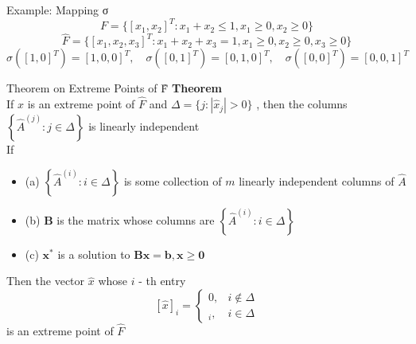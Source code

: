 \documentclass[aspectratio=169,hyperref,UTF8,CJK]{beamer}
\begin{document}
\begin{frame}{Example: Mapping σ}
\[
F = \{[x_1, x_2]^T : x_1 + x_2 \le 1, x_1 \ge 0, x_2 \ge 0\}
\]
\[
\hat{F} = \{[x_1, x_2, x_3]^T : x_1 + x_2 + x_3 = 1, x_1 \ge 0, x_2 \ge 0, x_3 \ge 0\}
\]
\[
\sigma([1, 0]^T) = [1, 0, 0]^T, \quad \sigma([0, 1]^T) = [0, 1, 0]^T, \quad \sigma([0, 0]^T) = [0, 0, 1]^T
\]
\end{frame}

\begin{frame}{Theorem on Extreme Points of F̂}
\textbf{Theorem} \\
If \(\hat{x}\) is an extreme point of \(\hat{F}\) and \(\Delta = \{j: |\hat{x}_j| > 0\}\) , then the columns \(\left\{\hat{A}^{(j)}: j \in \Delta\right\}\) is linearly independent \\
If
\begin{itemize}
    \item (a) \(\left\{\hat{A}^{(i)}: i \in \Delta\right\}\) is some collection of \(m\) linearly independent columns of \(\hat{A}\)
    \item (b) \(\mathbf{B}\) is the matrix whose columns are \(\left\{\hat{A}^{(i)}: i \in \Delta\right\}\)
    \item (c) \(\mathbf{x}^*\) is a solution to \(\mathbf{B}\mathbf{x} = \mathbf{b}, \mathbf{x} \geq \mathbf{0}\)
\end{itemize}
Then the vector \(\hat{x}\) whose \(i\) - th entry
\[
[\hat{x}]_i = \left\{ \begin{array}{ll} 0, & i \notin \Delta \\ [\mathbf{x}^*]_i, & i \in \Delta \end{array} \right.
\]
is an extreme point of \(\hat{F}\)
\end{frame}
\end{document}
